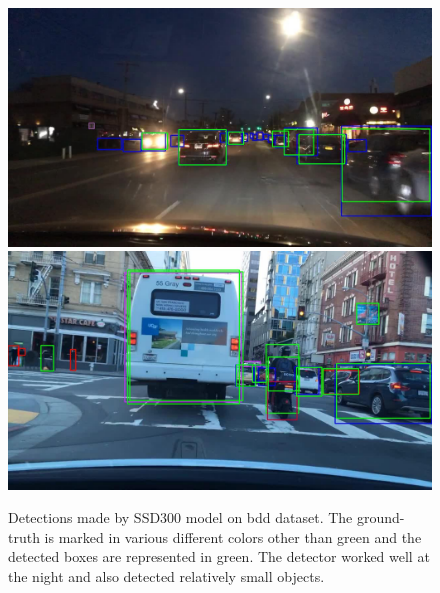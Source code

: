     \begin{figure}
        \centering
        \includegraphics[scale=0.45]{images/detections/ssd/b1d10d08-5b108225.jpg}
        \includegraphics[scale=0.45]{images/detections/ssd/b1d9e136-6c94ea3f.jpg}
        \caption[Detection on images from \acrshort{bdd} dataset]{Detections made by SSD300 model on \acrshort{bdd} dataset. The ground-truth is marked in various different colors other than green and the detected boxes are represented in green. The detector worked well at the night and also detected relatively small objects.}
        \label{fig:bdd_detections}
    \end{figure}
    
